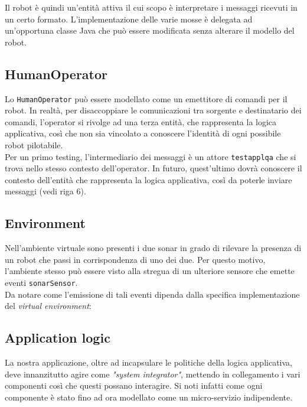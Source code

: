 \documentclass{../llncs}
\newcommand{\codescript}[1]{{\scriptsize{\texttt{#1}}}\xspace}
\begin{document}
Il robot è quindi un'entità attiva il cui scopo è interpretare i messaggi ricevuti in un certo formato. L'implementazione delle varie mosse è delegata ad un'opportuna classe Java che può essere modificata senza alterare il modello del robot.\\



\subsection{HumanOperator}
Lo \texttt{HumanOperator} può essere modellato come un emettitore di comandi per il robot. In realtà, per disaccoppiare le comunicazioni tra sorgente e destinatario dei comandi, l'operator si rivolge ad una terza entità, che rappresenta la logica applicativa, così che non sia vincolato a conoscere l'identità di ogni possibile robot pilotabile.\\



Per un primo testing, l'intermediario dei messaggi è un attore \codescript{testapplqa} che si trova nello stesso contesto dell'operator. In futuro, quest'ultimo dovrà conoscere il contesto dell'entità che rappresenta la logica applicativa, così da poterle inviare messaggi (vedi riga 6).

\subsection{Environment}
Nell'ambiente virtuale sono presenti i due sonar in grado di rilevare la presenza di un robot che passi in corrispondenza di uno dei due. Per questo motivo, l'ambiente stesso può essere visto alla stregua di un ulteriore sensore che emette eventi \codescript{sonarSensor}.\\



Da notare come l'emissione di tali eventi dipenda dalla specifica implementazione del \textit{virtual environment}:



\subsection{Application logic}
La nostra applicazione, oltre ad incapsulare le politiche della logica applicativa, deve innanzitutto agire come \textit{"system integrator"}, mettendo in collegamento i vari componenti così che questi possano interagire.
Si noti infatti come ogni componente è stato fino ad ora modellato come un micro-servizio indipendente.\\
\end{document}
